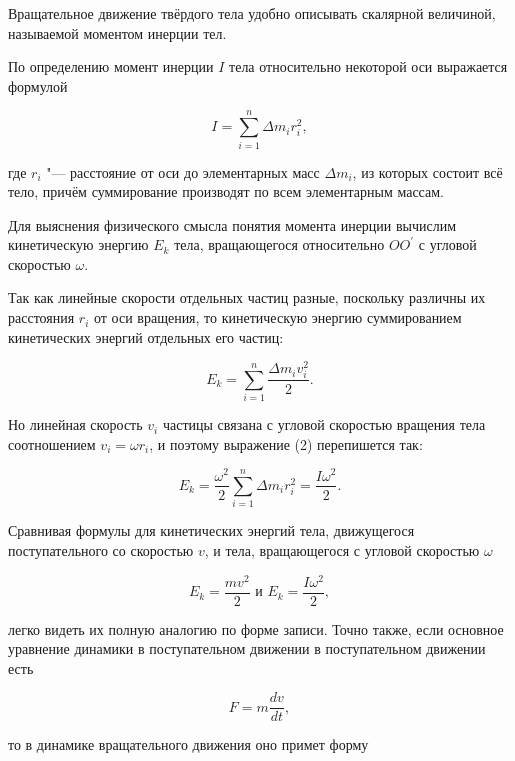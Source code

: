 Вращательное движение твёрдого тела удобно описывать скалярной величиной, называемой моментом инерции тел.

По определению момент инерции $I$ тела относительно некоторой оси выражается формулой

\begin{equation}
    I = \sum_{i = 1}^{n} \Delta m_i r_i^2,
\end{equation}

где $r_i$ "--- расстояние от оси до элементарных масс $\Delta m_i$, из которых состоит всё тело,
причём суммирование производят по всем элементарным массам.

Для выяснения физического смысла понятия момента инерции вычислим кинетическую энергию $E_k$ тела,
вращающегося относительно $OO^{'}$ с угловой скоростью $\omega$.

Так как линейные скорости отдельных частиц разные, поскольку различны их расстояния $r_i$ от оси вращения,
то кинетическую энергию суммированием кинетических энергий отдельных его частиц:

\begin{equation}
    E_k = \sum_{i = 1}^{n} \frac{\Delta m_iv_i^2}{2}.
\end{equation}

Но линейная скорость $v_i$ частицы связана с угловой скоростью вращения тела соотношением $v_i = \omega r_i$,
и поэтому выражение (2) перепишется так:

\begin{equation}
    E_k = \frac{\omega^2}{2} \sum_{i = 1}^{n} \Delta m_ir_i^2 = \frac{I\omega^2}{2}.  
\end{equation}

Сравнивая формулы для кинетических энергий тела,
движущегося поступательного со скоростью $v$, и тела,
вращающегося с угловой скоростью $\omega$

\begin{equation*}
    E_k = \frac{mv^2}{2} 
    \text{ и }
    E_k = \frac{I\omega^2}{2},
\end{equation*}

легко видеть их полную аналогию по форме записи.
Точно также, если основное уравнение динамики в поступательном движении в поступательном движении есть

\begin{equation}
    F = m\frac{dv}{dt},
\end{equation}

то в динамике вращательного движения оно примет форму

